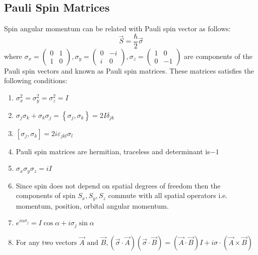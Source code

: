\subsection{Pauli Spin Matrices}
Spin angular momentum can be related with Pauli spin vector as follows:
$$
\vec{S}=\frac{\hbar}{2} \vec{\sigma}
$$
where $\sigma_{x}=\left(\begin{array}{ll}0 & 1 \\ 1 & 0\end{array}\right), \sigma_{y}=\left(\begin{array}{cc}0 & -i \\ i & 0\end{array}\right), \sigma_{z}=\left(\begin{array}{cc}1 & 0 \\ 0 & -1\end{array}\right)$ are components of the Pauli spin vectors and known as Pauli spin matrices. These matrices satisfies the following conditions:
\begin{enumerate}[label=\roman*)]
	\item  $\sigma_{x}^{2}=\sigma_{y}^{2}=\sigma_{z}^{2}=I$
	\item  $\sigma_{j} \sigma_{k}+\sigma_{k} \sigma_{j}=\left\{\sigma_{j}, \sigma_{k}\right\}=2 I \delta_{j k}$
	\item $\left[\sigma_{j}, \sigma_{k}\right]=2 i \varepsilon_{j k l} \sigma_{l}$
	\item  Pauli spin matrices are hermitian, traceless and determinant is$-1 $
	\item  $\sigma_{x} \sigma_{y} \sigma_{z}=i I$
	\item  Since spin does not depend on spatial degrees of freedom then the components of spin $S_{x}, S_{y}, S_{z}$ commute with all spatial operators i.e. momentum, position, orbital angular momentum.
	\item $ e^{i \alpha \sigma_{j}}=I \cos \alpha+i \sigma_{j} \sin \alpha$
	\item  For any two vectors $ \vec{A} \text { and } \vec{B},(\vec{\sigma} \cdot \vec{A})(\vec{\sigma} \cdot \vec{B})=(\vec{A} \cdot \vec{B}) I+i \sigma \cdot(\vec{A} \times \vec{B})$
\end{enumerate}
